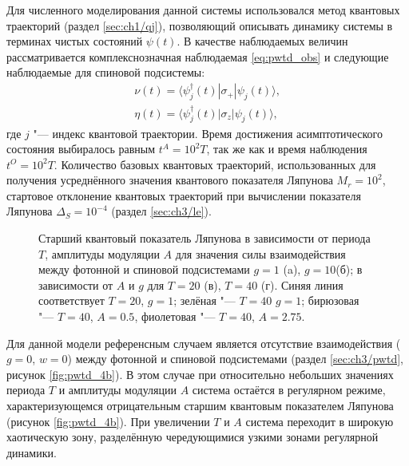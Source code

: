 Для численного моделирования данной системы использовался метод квантовых траекторий (раздел \cref{sec:ch1/qj}), позволяющий описывать динамику системы в терминах чистых состояний $\psi(t)$.
В качестве наблюдаемых величин рассматривается комплекснозначная наблюдаемая \cref{eq:pwtd_obs} и следующие наблюдаемые для спиновой подсистемы:
\begin{equation}
	\label{eq:csp_eta_nu}
	\begin{gathered}
		\nu(t) = \langle\psi^{\dagger}_{j}(t)| \sigma_+ |\psi_j(t)\rangle,\\
		\eta(t) = \langle\psi^{\dagger}_{j}(t)| \sigma_z |\psi_j(t)\rangle,
	\end{gathered}
\end{equation}
где $j$ "--- индекс квантовой траектории. Время достижения асимптотического состояния выбиралось равным \(t^A = 10^2 T\), так же как и время наблюдения \(t^O = 10^2 T\). Количество базовых квантовых траекторий, использованных для получения усреднённого значения квантового показателя Ляпунова $M_r=10^2$, стартовое отклонение квантовых траекторий при вычислении показателя Ляпунова $\Delta_S = 10^{-4}$ (раздел \cref{sec:ch3/le}).

\begin{figure}[h]
	\caption[Старший квантовый показатель Ляпунова в зависимости от периода, амплитуды модуляции и силы взаимодействия между фотонной и спиновой подсистемами.]{
		Старший квантовый показатель Ляпунова в зависимости от периода $T$, амплитуды модуляции $A$ для значения силы взаимодействия между фотонной и спиновой подсистемами $g=1$ (a), $g=10$(б); в зависимости от $A$ и $g$ для $T=20$ (в), $T=40$ (г). Синяя линия соответствует $T=20$, $g=1$; зелёная "--- $T=40$ $g=1$; бирюзовая "--- $T=40$, $A=0.5$, фиолетовая "---  $T=40$, $A=2.75$.
	}
	\label{fig:csp_1}
\end{figure}



Для данной модели референсным случаем является отсутствие взаимодействия ($g=0$, $w=0$) между фотонной и спиновой подсистемами (раздел \cref{sec:ch3/pwtd}, рисунок \cref{fig:pwtd_4b}). В этом случае при относительно небольших значениях периода $T$ и амплитуды модуляции $A$ система остаётся в регулярном режиме, характеризующемся отрицательным старшим квантовым показателем Ляпунова (рисунок \cref{fig:pwtd_4b}).
При увеличении $T$ и $A$ система переходит в широкую хаотическую зону, разделённую чередующимися узкими зонами регулярной динамики.

